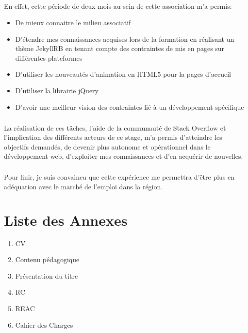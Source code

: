 \documentclass[11pt,a4paper,twoside]{report}
\begin{document}
	\paragraph*{}En effet, cette période de deux mois au sein de cette association m'a permis:
	\begin{itemize}
		\item De mieux connaitre le milieu associatif
		\item D'étendre mes connaissances acquises lors de la formation en réalisant un thème JekyllRB en tenant compte des contraintes de mis en pages sur différentes plateformes
		\item D'utiliser les nouveautés d'animation en HTML5 pour la pages d'accueil
		\item D'utiliser la librairie jQuery
		\item D'avoir une meilleur vision des contraintes lié à un développement spécifique
	\end{itemize}
	\paragraph*{}La réalisation de ces tâches, l'aide de la communauté de Stack Overflow et l'implication des différents acteurs de ce stage, m'a permis d'atteindre les objectifs demandés, de devenir plus autonome et opérationnel dans le développement web, d'exploiter mes connaissances et d'en acquérir de nouvelles.
	\paragraph*{}Pour finir, je suis convaincu que cette expérience me permettra d'être plus en adéquation avec le marché de l'emploi dans la région.

\chapter{Liste des Annexes}
	\begin{enumerate}
		\item CV
		\item Contenu pédagogique
		\item Présentation du titre
		\item RC
		\item REAC
		\item Cahier des Charges
	\end{enumerate}

\end{document}
